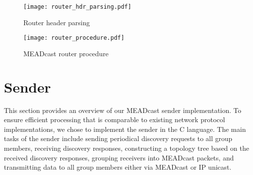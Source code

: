 %
\begin{figure}
    \begin{center}
        \texttt{[image: router\_hdr\_parsing.pdf]}
    \end{center}
    \caption{Router header parsing}
    \label{fig:router_hdr_parsing}
\end{figure}

\begin{figure}
    \begin{center}
        \texttt{[image: router\_procedure.pdf]}
    \end{center}
    \caption{MEADcast router procedure}
    \label{fig:router_procedure}
\end{figure}


\section{Sender} %
\label{sec:Sender}
This section provides an overview of our MEADcast sender implementation.
To ensure efficient processing that is comparable to existing network
    protocol implementations, we chose to implement the sender in the C
    language.
The main tasks of the sender include sending periodical discovery requests to
    all group members, receiving discovery responses, constructing a topology
    tree based on the received discovery responses, grouping receivers into
    MEADcast packets, and transmitting data to all group members either via
    MEADcast or IP unicast.

